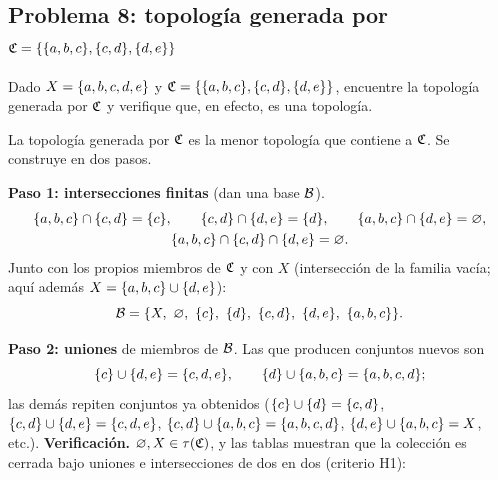 \subsection{Problema 8: topología generada por \texorpdfstring{$\mathfrak{C}=\{\{a,b,c\},\{c,d\},\{d,e\}\}$}{C}}
\begin{enunciado}
Dado $X=\{a,b,c,d,e\}$ y $\mathfrak{C}=\{\{a,b,c\},\{c,d\},\{d,e\}\}$, encuentre la topología generada por $\mathfrak{C}$ y verifique
que, en efecto, es una topología.
\end{enunciado}
La topología generada por $\mathfrak{C}$ es la menor topología que contiene a $\mathfrak{C}$. Se construye en dos pasos.

\textbf{Paso 1: intersecciones finitas} (dan una base $\mathcal{B}$).
\begin{gather*}
\{a,b,c\}\cap\{c,d\}=\{c\},\qquad \{c,d\}\cap\{d,e\}=\{d\},\qquad \{a,b,c\}\cap\{d,e\}=\varnothing,\\
\{a,b,c\}\cap\{c,d\}\cap\{d,e\}=\varnothing .
\end{gather*}
Junto con los propios miembros de $\mathfrak{C}$ y con $X$ (intersección de la familia vacía; aquí además
$X=\{a,b,c\}\cup\{d,e\}$):
\[\B=\{X,\ \vac,\ \s{c},\ \s{d},\ \s{c,d},\ \s{d,e},\ \s{a,b,c}\}.\]

\textbf{Paso 2: uniones} de miembros de $\mathcal{B}$. Las que producen conjuntos nuevos son
\[
\{c\}\cup\{d,e\}=\{c,d,e\},\qquad \{d\}\cup\{a,b,c\}=\{a,b,c,d\};
\]
las demás repiten conjuntos ya obtenidos ($\{c\}\cup\{d\}=\{c,d\}$, $\{c,d\}\cup\{d,e\}=\{c,d,e\}$,
$\{c,d\}\cup\{a,b,c\}=\{a,b,c,d\}$, $\{d,e\}\cup\{a,b,c\}=X$, etc.).
\textbf{Verificación.} $\varnothing,X\in\tau(\mathfrak{C})$, y las tablas muestran que la colección es cerrada bajo uniones e
intersecciones de dos en dos (criterio H1):
\begin{center}{\scriptsize\renewcommand{\arraystretch}{1.2}\setlength{\tabcolsep}{3.5pt}}\end{center}
\begin{center}{\scriptsize\renewcommand{\arraystretch}{1.2}\setlength{\tabcolsep}{3.5pt}}\end{center}

